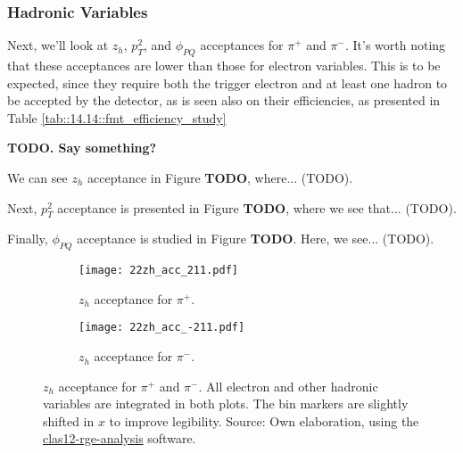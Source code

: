 \subsubsection{Hadronic Variables}
\label{14.22::hadronic_variables}
    Next, we'll look at $z_h$, $p_T^2$, and $\phi_{PQ}$ acceptances for $\pi^+$ and $\pi^-$.
    It's worth noting that these acceptances are lower than those for electron variables.
    This is to be expected, since they require both the trigger electron and at least one hadron to be accepted by the detector, as is seen also on their efficiencies, as presented in Table \ref{tab::14.14::fmt_efficiency_study}

    \textbf{TODO. Say something?}

    We can see $z_h$ acceptance in Figure \textbf{TODO}, where... (TODO).

    Next, $p_T^2$ acceptance is presented in Figure \textbf{TODO}, where we see that... (TODO).

    Finally, $\phi_{PQ}$ acceptance is studied in Figure \textbf{TODO}.
    Here, we see... (TODO).

    \begin{figure}
        \centering
        \begin{subfigure}[b]{0.49\textwidth}
            \centering
            \texttt{[image: 22zh\_acc\_211.pdf]}
            \caption{$z_h$ acceptance for $\pi^+$.}
            \label{fig::14.22::zh_acc_211}
        \end{subfigure}
        \hfill
        \begin{subfigure}[b]{0.49\textwidth}
            \centering
            \texttt{[image: 22zh\_acc\_-211.pdf]}
            \caption{$z_h$ acceptance for $\pi^-$.}
            \label{fig::14.22::zh_acc_-211}
        \end{subfigure}
        \caption[$z_h$ acceptance.]{$z_h$ acceptance for $\pi^+$ and $\pi^-$.
        All electron and other hadronic variables are integrated in both plots.
        The bin markers are slightly shifted in $x$ to improve legibility.
        Source: Own elaboration, using the \href{https://github.com/bleaktwig/clas12-rge-analysis}{clas12-rge-analysis} software.}
        \label{fig::14.22::zh_acc}
    \end{figure}

